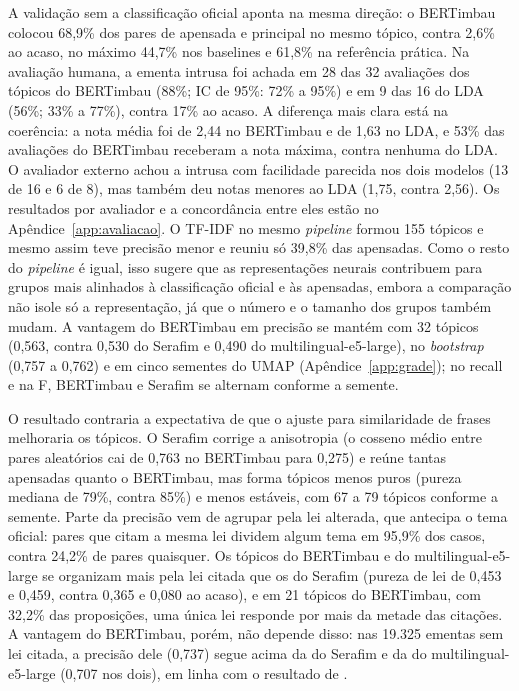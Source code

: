 \documentclass[12pt]{article}
\begin{document}
A validação sem a classificação oficial aponta na mesma direção: o BERTimbau colocou 68,9\% dos pares de apensada e principal no mesmo tópico, contra 2,6\% ao acaso, no máximo 44,7\% nos baselines e 61,8\% na referência prática. Na avaliação humana, a ementa intrusa foi achada em 28 das 32 avaliações dos tópicos do BERTimbau (88\%; IC de 95\%: 72\% a 95\%) e em 9 das 16 do LDA (56\%; 33\% a 77\%), contra 17\% ao acaso. A diferença mais clara está na coerência: a nota média foi de 2,44 no BERTimbau e de 1,63 no LDA, e 53\% das avaliações do BERTimbau receberam a nota máxima, contra nenhuma do LDA. O avaliador externo achou a intrusa com facilidade parecida nos dois modelos (13 de 16 e 6 de 8), mas também deu notas menores ao LDA (1,75, contra 2,56). Os resultados por avaliador e a concordância entre eles estão no Apêndice~\ref{app:avaliacao}. O TF-IDF no mesmo \textit{pipeline} formou 155 tópicos e mesmo assim teve precisão menor e reuniu só 39,8\% das apensadas. Como o resto do \textit{pipeline} é igual, isso sugere que as representações neurais contribuem para grupos mais alinhados à classificação oficial e às apensadas, embora a comparação não isole só a representação, já que o número e o tamanho dos grupos também mudam. A vantagem do BERTimbau em precisão se mantém com 32 tópicos (0,563, contra 0,530 do Serafim e 0,490 do multilingual-e5-large), no \textit{bootstrap} (0,757 a 0,762) e em cinco sementes do UMAP (Apêndice~\ref{app:grade}); no recall e na F, BERTimbau e Serafim se alternam conforme a semente.

O resultado contraria a expectativa de que o ajuste para similaridade de frases melhoraria os tópicos. O Serafim corrige a anisotropia (o cosseno médio entre pares aleatórios cai de 0,763 no BERTimbau para 0,275) e reúne tantas apensadas quanto o BERTimbau, mas forma tópicos menos puros (pureza mediana de 79\%, contra 85\%) e menos estáveis, com 67 a 79 tópicos conforme a semente. Parte da precisão vem de agrupar pela lei alterada, que antecipa o tema oficial: pares que citam a mesma lei dividem algum tema em 95,9\% dos casos, contra 24,2\% de pares quaisquer. Os tópicos do BERTimbau e do multilingual-e5-large se organizam mais pela lei citada que os do Serafim (pureza de lei de 0,453 e 0,459, contra 0,365 e 0,080 ao acaso), e em 21 tópicos do BERTimbau, com 32,2\% das proposições, uma única lei responde por mais da metade das citações. A vantagem do BERTimbau, porém, não depende disso: nas 19.325 ementas sem lei citada, a precisão dele (0,737) segue acima da do Serafim e da do multilingual-e5-large (0,707 nos dois), em linha com o resultado de \citet{ferreira2025semantic}.
\end{document}

